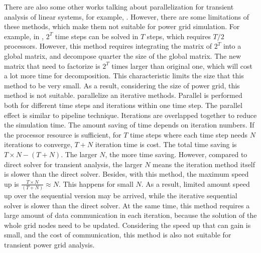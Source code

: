 There are also some other works talking about parallelization for transient analysis of linear systems, for example, \cite{Alvarado, Scala, 
Chai}. However, there are some limitations of these methods, which make them not suitable for power grid simulation. For example, in 
\cite{Alvarado}, $2^T$ time steps can be solved in $T$ steps, which requires $T/2$ processors. However, this method requires integrating 
the matrix of $2^T$ into a global matrix, and decompose quarter the size of the global matrix. The new matrix that need to factorize is
$2^T$ times larger than original one, which will cost a lot more time for decomposition. This characteristic limits the size that this
method to be very small. As a result, considering the size of power grid, this method is not suitable. \cite{Chai} parallelize an 
iterative methods. Parallel is performed both for different time steps and iterations within one time step. The parallel effect is similar
to pipeline technique. Iterations are overlapped together to reduce the simulation time. The amount saving of time depends on iteration 
numbers. If the processor resource is sufficient, for $T$ time steps where each time step needs $N$ iterations to converge, $T+N$ iteration
time is cost. The total time saving is $T\times N - (T+N)$. The larger $N$, the more time saving. However, compared to direct
solver for transient analysis, the larger $N$ means the iteration method itself is slower than the direct solver. Besides, with this method, the maximum speed up is $\frac{T\times N}{(T+N)} \approx N$. This happens for small $N$. As a result, limited amount speed up over the sequential version may be arrived, while the iterative sequential solver is slower than the direct solver. 
At the same time, this method requires a large amount of data communication in each iteration, because the solution of the whole grid 
nodes need to be updated. Considering the speed up that can gain is small, and the cost of communication, this method is also not suitable
for transient power grid analysis. 

